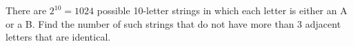 There are $2^{10}=1024$ possible 10-letter strings in which each letter is either an A or a B. Find the number of such strings that do not have more than 3 adjacent letters that are identical.